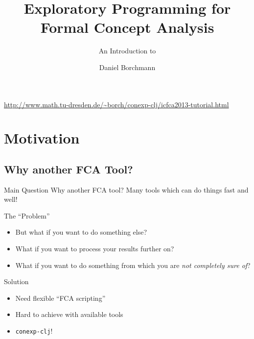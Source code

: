 \documentclass{beamer}
\title[\cclj]{Exploratory Programming for Formal Concept Analysis}
\subtitle{An Introduction to \cclj}
\author{Daniel Borchmann}
\institute{TU Dresden}
\newcommand{\cclj}{\texttt{conexp-clj}\xspace}
\begin{document}
\begin{frame}
  \maketitle

  \centerline{%
    \footnotesize%
    \url{http://www.math.tu-dresden.de/~borch/conexp-clj/icfca2013-tutorial.html}}
\end{frame}

\section{Motivation}

\subsection{Why another FCA Tool?}

\begin{frame}

  \onslide<+->

  \begin{block}{Main Question}
    Why another FCA tool? \onslide<+->Many tools which can do things fast and well!
  \end{block}

  \onslide<+->

  \begin{block}{The ``Problem''}
    \begin{itemize}
    \item<+-> But what if you want to do something else?
    \item<+-> What if you want to process your results further on?
    \item<+-> What if you want to do something from which you are \emph{not completely
        sure of}?
    \end{itemize}
  \end{block}

  \onslide<+->

  \begin{block}{Solution}
    \begin{itemize}
    \item Need flexible ``FCA scripting''
    \item<+-> Hard to achieve with available tools
    \item<+-> \cclj!
    \end{itemize}
  \end{block}

\end{frame}
\end{document}
